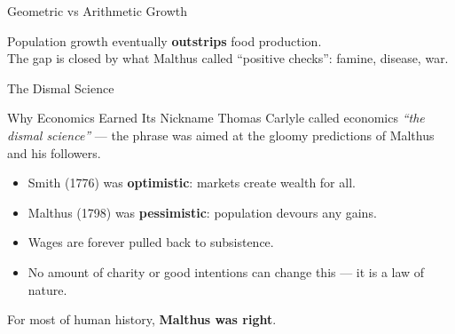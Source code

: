 \documentclass[aspectratio=169, 10pt]{beamer}
\begin{document}
\begin{frame}{Geometric vs Arithmetic Growth}
\begin{center}
\end{center}
\vspace{0.3em}
Population growth eventually \textbf{outstrips} food production.\\
The gap is closed by what Malthus called ``positive checks'': famine, disease, war.
\end{frame}

\begin{frame}{The Dismal Science}
\begin{block}{Why Economics Earned Its Nickname}
  Thomas Carlyle called economics \textit{``the dismal science''} ---
  the phrase was aimed at the gloomy predictions of Malthus and his followers.
\end{block}
\vspace{0.5em}
\begin{itemize}
  \item Smith (1776) was \textbf{optimistic}: markets create wealth for all.
  \item Malthus (1798) was \textbf{pessimistic}: population devours any gains.
  \item Wages are forever pulled back to \alert{subsistence}.
  \item No amount of charity or good intentions can change this ---
        it is a law of nature.
\end{itemize}
\vspace{0.5em}
For most of human history, \textbf{Malthus was right}.
\end{frame}
\end{document}
